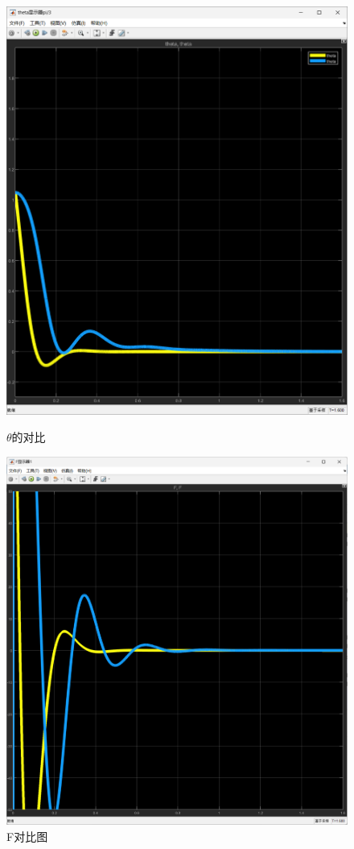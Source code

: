 \documentclass[12pt,a4paper,UTF8]{article}
\begin{document}
\begin{figure}[!htbp]
    \centering
    \begin{minipage}[b]{0.45\linewidth}
        \centering
        \includegraphics[width=0.7\linewidth]{figures/image.png}
        \caption{$\theta$的对比}
         
    \end{minipage}%
    \begin{minipage}[b]{0.45\linewidth}
        \centering
        \includegraphics[width=0.7\linewidth]{figures/f_2.png}
    \caption{F对比图}
    \end{minipage}
    

\end{figure}
\end{document}
